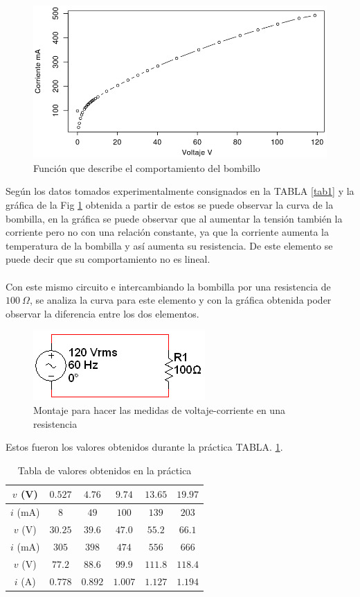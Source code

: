 \documentclass[twocolumn]{IEEEtran}
\begin{document}
\begin{figure}[H]
	\centering
		\includegraphics[scale=0.3]{reg.png}
	\caption{Función que describe el comportamiento del bombillo}
	\label{fig11}
\end{figure}
\noindent
Según los datos tomados experimentalmente consignados en la TABLA \ref{tab1} y la gráfica de la Fig \ref{fig11} obtenida a partir de estos se puede observar la curva de la bombilla, en la gráfica se puede observar que al aumentar la tensión también la corriente pero no con una relación constante, ya que la corriente aumenta la temperatura de la bombilla y así aumenta su resistencia.  De este elemento se puede decir que su comportamiento no es lineal.\\\\
Con este mismo circuito e intercambiando la bombilla por una resistencia de $100 \ \Omega$, se analiza la curva para este elemento y con la gráfica obtenida poder observar la diferencia entre los dos elementos.
\begin{figure}[H]
	\centering
		\includegraphics[scale=1]{b2.png}
	\caption{Montaje para hacer las medidas de voltaje-corriente en una resistencia}
	\label{fig4}
\end{figure}
\noindent
Estos fueron los valores obtenidos durante la práctica TABLA. \ref{tab2}.
\begin{table}[H]
	\centering
\begin{tabular}[c]{|c||c|c|c|c|c|} \hline
$v$ (V) & $0.527$ & $4.76$ & $9.74$ & $13.65$ & $19.97$ \\ \hline
$i$ (mA) & $8$ & $49$ & $100$ & $139$ & $203$ \\ \hline \hline
$v$ (V) & $30.25$ & $39.6$ & $47.0$ & $55.2$ & $66.1$ \\ \hline
$i$ (mA) & $305$ & $398$ & $474$ & $556$ & $666$ \\ \hline \hline
$v$ (V) & $77.2$ & $88.6$ & $99.9$ & $111.8$ & $118.4$ \\ \hline
$i$ (A) & $0.778$ & $0.892$ & $1.007$ & $1.127$ & $1.194$ \\ \hline
\end{tabular}
	\caption{Tabla de valores obtenidos en la práctica}
	\label{tab2}
\end{table}
\end{document}
